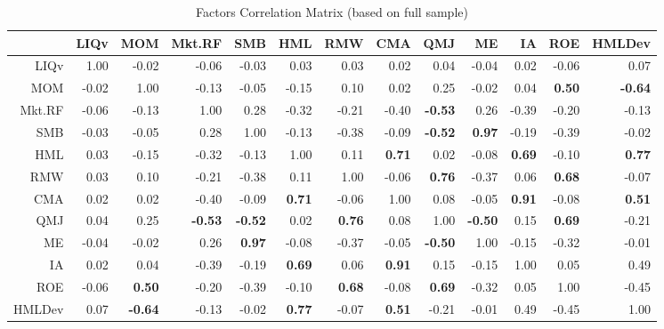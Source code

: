 \documentclass[12pt]{article}
\begin{document}
\begin{table}[ht]
	\scriptsize
	\centering
	\begin{tabular}{rrrrrrrrrrrrr}
		\hline
		& LIQv & MOM & Mkt.RF & SMB & HML & RMW & CMA & QMJ & ME & IA & ROE & HMLDev \\ 
		\hline
		LIQv & 1.00 & -0.02 & -0.06 & -0.03 & 0.03 & 0.03 & 0.02 & 0.04 & -0.04 & 0.02 & -0.06 & 0.07 \\ 
		MOM & -0.02 & 1.00 & -0.13 & -0.05 & -0.15 & 0.10 & 0.02 & 0.25 & -0.02 & 0.04 &\textbf{ 0.50} & \textbf{-0.64} \\ 
		Mkt.RF & -0.06 & -0.13 & 1.00 & 0.28 & -0.32 & -0.21 & -0.40 & \textbf{-0.53} & 0.26 & -0.39 & -0.20 & -0.13 \\ 
		SMB & -0.03 & -0.05 & 0.28 & 1.00 & -0.13 & -0.38 & -0.09 & \textbf{-0.52} & \textbf{0.97} & -0.19 & -0.39 & -0.02 \\ 
		HML & 0.03 & -0.15 & -0.32 & -0.13 & 1.00 & 0.11 & \textbf{0.71} & 0.02 & -0.08 & \textbf{0.69} & -0.10 & \textbf{0.77 }\\ 
		RMW & 0.03 & 0.10 & -0.21 & -0.38 & 0.11 & 1.00 & -0.06 & \textbf{0.76} & -0.37 & 0.06 & \textbf{0.68} & -0.07 \\ 
		CMA & 0.02 & 0.02 & -0.40 & -0.09 & \textbf{0.71} & -0.06 & 1.00 & 0.08 & -0.05 & \textbf{0.91} & -0.08 & \textbf{0.51} \\ 
		QMJ & 0.04 & 0.25 & \textbf{-0.53} & \textbf{-0.52} & 0.02 & \textbf{0.76} & 0.08 & 1.00 & \textbf{-0.50} & 0.15 & \textbf{0.69} & -0.21 \\ 
		ME & -0.04 & -0.02 & 0.26 & \textbf{0.97} & -0.08 & -0.37 & -0.05 & \textbf{-0.50} & 1.00 & -0.15 & -0.32 & -0.01 \\ 
		IA & 0.02 & 0.04 & -0.39 & -0.19 & \textbf{0.69} & 0.06 &\textbf{ 0.91} & 0.15 & -0.15 & 1.00 & 0.05 & 0.49 \\ 
		ROE & -0.06 & \textbf{0.50} & -0.20 & -0.39 & -0.10 & \textbf{0.68} & -0.08 & \textbf{0.69} & -0.32 & 0.05 & 1.00 & -0.45 \\ 
		HMLDev & 0.07 & \textbf{-0.64} & -0.13 & -0.02 & \textbf{0.77} & -0.07 & \textbf{0.51} & -0.21 & -0.01 & 0.49 & -0.45 & 1.00 \\ 
		\hline
	\end{tabular}
	\caption{Factors Correlation Matrix (based on full sample)}
\end{table}
\end{document}
